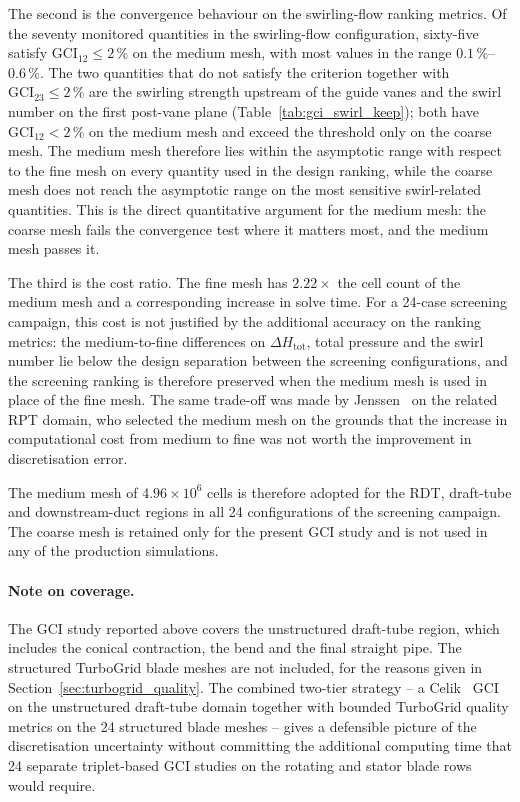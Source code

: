 The second is the convergence behaviour on the swirling-flow ranking metrics. Of the seventy monitored quantities in the swirling-flow configuration, sixty-five satisfy $\mathrm{GCI}_{12} \leq 2\,\%$ on the medium mesh, with most values in the range $0.1\,\%$--$0.6\,\%$. The two quantities that do not satisfy the criterion together with $\mathrm{GCI}_{23} \leq 2\,\%$ are the swirling strength upstream of the guide vanes and the swirl number on the first post-vane plane (Table~\ref{tab:gci_swirl_keep}); both have $\mathrm{GCI}_{12} < 2\,\%$ on the medium mesh and exceed the threshold only on the coarse mesh. The medium mesh therefore lies within the asymptotic range with respect to the fine mesh on every quantity used in the design ranking, while the coarse mesh does not reach the asymptotic range on the most sensitive swirl-related quantities. This is the direct quantitative argument for the medium mesh: the coarse mesh fails the convergence test where it matters most, and the medium mesh passes it.

The third is the cost ratio. The fine mesh has $2.22\times$ the cell count of the medium mesh and a corresponding increase in solve time. For a 24-case screening campaign, this cost is not justified by the additional accuracy on the ranking metrics: the medium-to-fine differences on $\Delta H_{\mathrm{tot}}$, total pressure and the swirl number lie below the design separation between the screening configurations, and the screening ranking is therefore preserved when the medium mesh is used in place of the fine mesh. The same trade-off was made by Jenssen~\cite{Jenssen2020} on the related RPT domain, who selected the medium mesh on the grounds that the increase in computational cost from medium to fine was not worth the improvement in discretisation error.

The medium mesh of $4.96\times 10^6$ cells is therefore adopted for the RDT, draft-tube and downstream-duct regions in all 24 configurations of the screening campaign. The coarse mesh is retained only for the present GCI study and is not used in any of the production simulations.

\paragraph{Note on coverage.}
The GCI study reported above covers the unstructured draft-tube region, which includes the conical contraction, the bend and the final straight pipe. The structured TurboGrid blade meshes are not included, for the reasons given in Section~\ref{sec:turbogrid_quality}. The combined two-tier strategy -- a Celik~\cite{Celik2008} GCI on the unstructured draft-tube domain together with bounded TurboGrid quality metrics on the 24 structured blade meshes -- gives a defensible picture of the discretisation uncertainty without committing the additional computing time that 24 separate triplet-based GCI studies on the rotating and stator blade rows would require.
 
